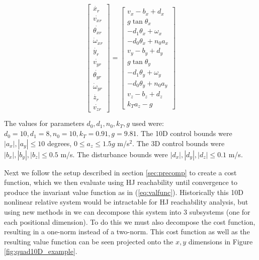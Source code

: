 \begin{equation}
\label{eq:Quad10DRel_dyn}
\begin{aligned}
\begin{array}{c}
\left[
\begin{array}{c}
\dot{x_r}\\
\dot{v_{xr}}\\
\dot{\theta_{xr}}\\
\dot\omega_{xr}\\
\dot{y_r}\\
\dot{v_{yr}}\\
\dot{\theta_{yr}}\\
\dot\omega_{yr}\\
\dot{z_r}\\
\dot{v_{zr}}
\end{array}
\right]
=
\left[
\begin{array}{c}
v_x - b_x + d_x\\
g \tan \theta_x\\
-d_1 \theta_x + \omega_x\\
-d_0 \theta_x + n_0 a_x\\
v_y - b_y + d_y\\
g \tan \theta_y\\
-d_1 \theta_y + \omega_y\\
-d_0 \theta_y + n_0 a_y\\
v_z - b_z + d_z\\
k_T a_z - g
\end{array}
\right]
\end{array}\\
\end{aligned}
\end{equation}
The values for parameters $d_0,d_1,n_0,k_T,g$ used were: $d_0=10,d_1=8,n_0=10,k_T=0.91,g=9.81$. The 10D control bounds were $|a_x|,|a_y|\leq10$ degrees, $0\leq a_z\leq 1.5g$ m/s$^{2}$. The 3D control bounds were $|b_x|,|b_y|,|b_z|\leq0.5$ m/s. The disturbance bounds were $|d_x|,|d_y|,|d_z|\leq0.1$ m/s.

Next we follow the setup described in section \ref{sec:precomp} to create a cost function, which we then evaluate using HJ reachability until convergence to produce the invariant value function as in (\ref{eq:valfunc}). Historically this 10D nonlinear relative system would be intractable for HJ reachability analysis, but using new methods in \cite{Chen2016b} we can decompose this system into 3 subsystems (one for each positional dimension). To do this we must also decompose the cost function, resulting in a one-norm instead of a two-norm. This cost function as well as the resulting value function can be seen projected onto the $x,y$ dimensions in Figure \ref{fig:quad10D_example}.

